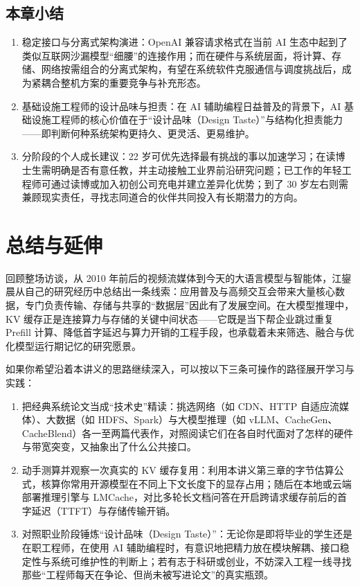 \documentclass[UTF8,a4paper,11pt,fontset=fandol]{ctexart}
\begin{document}
\subsection{本章小结}
\begin{enumerate}
\item 稳定接口与分离式架构演进：OpenAI 兼容请求格式在当前 AI 生态中起到了类似互联网沙漏模型“细腰”的连接作用；而在硬件与系统层面，将计算、存储、网络按需组合的分离式架构，有望在系统软件克服通信与调度挑战后，成为紧耦合整机方案的重要竞争与补充形态。
\item 基础设施工程师的设计品味与担责：在 AI 辅助编程日益普及的背景下，AI 基础设施工程师的核心价值在于“设计品味（Design Taste）”与结构化担责能力——即判断何种系统架构更持久、更灵活、更易维护。
\item 分阶段的个人成长建议：22 岁可优先选择最有挑战的事以加速学习；在读博士生需明确是否有意任教，并主动接触工业界前沿研究问题；已工作的年轻工程师可通过读博或加入初创公司充电并建立差异化优势；到了 30 岁左右则需兼顾现实责任，寻找志同道合的伙伴共同投入有长期潜力的方向。
\end{enumerate}
\section{总结与延伸}
回顾整场访谈，从 2010 年前后的视频流媒体到今天的大语言模型与智能体，江鋆晨从自己的研究经历中总结出一条线索：应用普及与高频交互会带来大量核心数据，专门负责传输、存储与共享的“数据层”因此有了发展空间。在大模型推理中，KV 缓存正是连接算力与存储的关键中间状态——它既是当下帮企业跳过重复 Prefill 计算、降低首字延迟与算力开销的工程手段，也承载着未来筛选、融合与优化模型运行期记忆的研究愿景。

如果你希望沿着本讲义的思路继续深入，可以按以下三条可操作的路径展开学习与实践：
\begin{enumerate}
\item 把经典系统论文当成“技术史”精读：挑选网络（如 CDN、HTTP 自适应流媒体）、大数据（如 HDFS、Spark）与大模型推理（如 vLLM、CacheGen、CacheBlend）各一至两篇代表作，对照阅读它们在各自时代面对了怎样的硬件与带宽突变，又抽象出了什么公共接口。
\item 动手测算并观察一次真实的 KV 缓存复用：利用本讲义第三章的字节估算公式，核算你常用开源模型在不同上下文长度下的显存占用；随后在本地或云端部署推理引擎与 LMCache，对比多轮长文档问答在开启跨请求缓存前后的首字延迟（TTFT）与存储传输开销。
\item 对照职业阶段锤炼“设计品味（Design Taste）”：无论你是即将毕业的学生还是在职工程师，在使用 AI 辅助编程时，有意识地把精力放在模块解耦、接口稳定性与系统可维护性的判断上；若有志于科研或创业，不妨深入工程一线寻找那些“工程师每天在争论、但尚未被写进论文”的真实瓶颈。
\end{enumerate}
\end{document}
